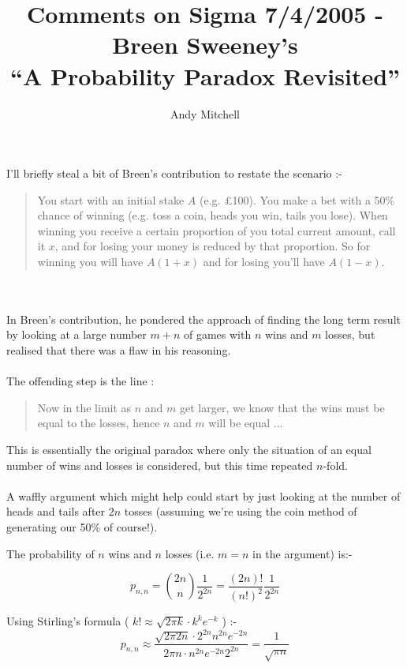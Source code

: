 \documentclass{article}
\author{Andy Mitchell}
\title{Comments on Sigma 7/4/2005 - Breen Sweeney's \\ ``A Probability Paradox Revisited''}
\begin{document}
 \maketitle \begin{flushleft}

I'll briefly steal a bit of Breen's contribution to restate the scenario :- \begin{quote} You start with an initial stake $A$ (e.g. \pounds100). You make a bet with a 50\% chance of winning (e.g. toss a coin, heads you win, tails you lose).
When winning you receive a certain proportion of you total current amount, call it $x$, and for losing your money is reduced by that proportion.
So for winning you will have $A(1+x)$ and for losing you'll have $A(1-x)$.
\end{quote}
\ \\
\ \\
In Breen's contribution, he pondered the approach of finding the long term result by looking at a large number $m+n$ of games with $n$ wins and $m$ losses, but realised that there was a flaw in his reasoning.
\ \\
\ \\
The offending step is the line :
\begin{quote}
Now in the limit as $n$ and $m$ get larger, we know that the wins must be equal to the losses, hence $n$ and $m$ will be equal ...
\end{quote}

This is essentially the original paradox where only the situation of an equal number of wins and losses is considered, but this time repeated $n$-fold.
\ \\
\ \\
A waffly argument which might help could start by just looking at the number of heads and tails after $2n$ tosses (assuming we're using the coin method of generating our 50\% of course!).


The probability of $n$ wins and $n$ losses (i.e. $m=n$ in the
argument) is:-


\begin{equation} \label{eq:A}
p_{n,n} = \binom{2n}{n}\frac{1}{2^{2n}} = \frac{(2n)!}{(n!)^2}\frac{1}{2^{2n}}
\end{equation}

Using Stirling's formula ( $k! \approx \sqrt{2 \pi k}\cdot k^{k}e^{-k}$
) :-
\begin{equation} \label{eq:B}
p_{n,n} \approx \frac{\sqrt{2\pi 2n}\cdot 2^{2n}n^{2n}e^{-2n}}{2\pi n\cdot n^{2n}e^{-2n}2^{2n}} = \frac{1}{\sqrt{\pi n}} \end{equation}


\end{flushleft}
\end{document}
